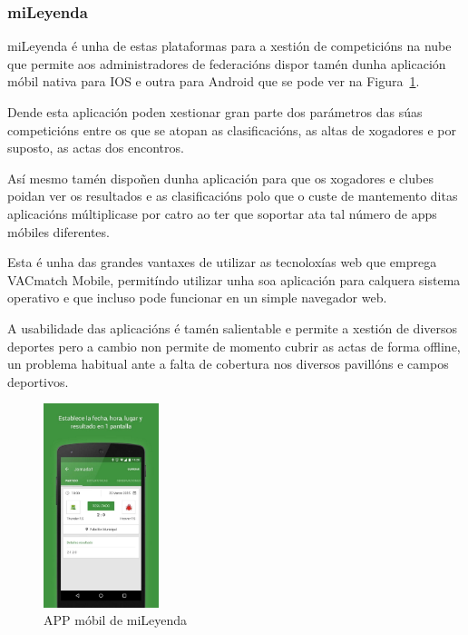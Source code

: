     \subsubsection{miLeyenda}

    miLeyenda é unha de estas plataformas para a xestión de competicións na 
nube que permite aos administradores de federacións dispor tamén dunha 
aplicación móbil nativa para IOS e outra para Android que se pode ver na 
Figura~\ref{fig:img:mileyenda}.

    Dende esta aplicación poden xestionar gran parte dos parámetros das súas competicións 
entre os que se atopan as clasificacións, as altas de xogadores e por 
suposto, as actas dos encontros.

    Así mesmo tamén dispoñen dunha aplicación para que os xogadores e clubes poidan ver 
os resultados e as clasificacións polo que o custe de mantemento ditas 
aplicacións múltiplicase por catro ao ter que soportar ata tal número de 
apps móbiles diferentes.

    Esta é unha das grandes vantaxes de utilizar as tecnoloxías web que emprega VACmatch 
Mobile, permitíndo utilizar unha soa aplicación para calquera sistema 
operativo e que incluso pode funcionar en un simple navegador web.

    A usabilidade das aplicacións é tamén salientable e permite a xestión de 
diversos deportes pero a cambio non permite de momento cubrir as actas de forma 
offline, un problema habitual ante a falta de cobertura nos diversos pavillóns e 
campos deportivos.

      \begin{figure}[h!]
	\begin{center}
	  \includegraphics[width=0.3\textwidth]{./img/mileyenda-app.png}
	  \caption{APP móbil de miLeyenda}
	  \label{fig:img:mileyenda}
	\end{center}
      \end{figure}

